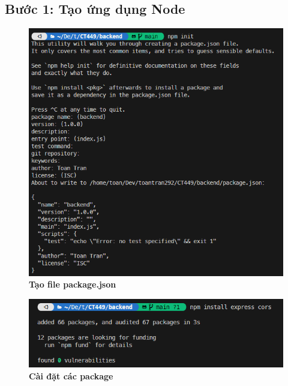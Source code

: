 \subsection*{Bước 1: Tạo ứng dụng Node}
\setcounter{subsection}{2}
\setcounter{figure}{0}
\begin{figure}[H]
  \centering
  \includegraphics[width=15cm]{images/chapterFirst/2.png}
  \caption{\bfseries Tạo file package.json}
\end{figure}
\begin{figure}[H]
  \centering
  \includegraphics{images/chapterFirst/3.png}
  \caption{\bfseries Cài đặt các package}
\end{figure}
